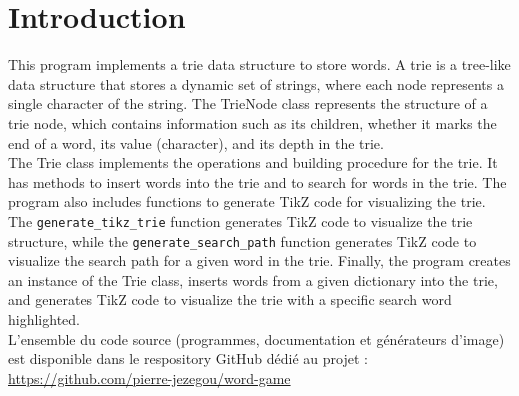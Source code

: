 \documentclass[10pt,a4paper,hidelinks]{article}
\begin{document}

\tableofcontents

\section{Introduction}
This program implements a trie data structure to store words.
A trie is a tree-like data structure that stores a dynamic set of strings, where each node represents a single character of the string.
The TrieNode class represents the structure of a trie node, which contains information such as its children, whether it marks the end of a word, its value (character), and its depth in the trie.\\

The Trie class implements the operations and building procedure for the trie. It has methods to insert words into the trie and to search for words in the trie.
The program also includes functions to generate TikZ code for visualizing the trie. The \verb|generate_tikz_trie| function generates TikZ code to visualize the trie structure, while the \verb|generate_search_path| function generates TikZ code to visualize the search path for a given word in the trie.
Finally, the program creates an instance of the Trie class, inserts words from a given dictionary into the trie, and generates TikZ code to visualize the trie with a specific search word highlighted.\\

L'ensemble du code source (programmes, documentation et générateurs d'image) est disponible dans le respository GitHub dédié au projet : \url{https://github.com/pierre-jezegou/word-game}
\end{document}
